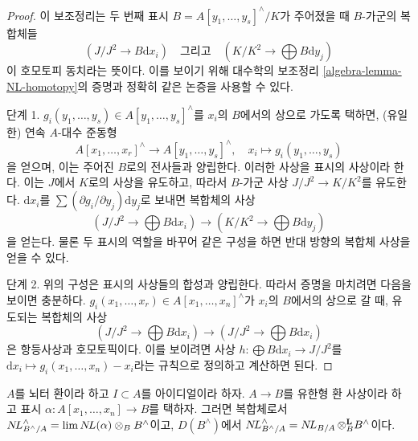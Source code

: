 \begin{proof}
이 보조정리는 두 번째 표시 $B = A[y_1, \ldots, y_s]^\wedge / K$가 주어졌을 때
$B$-가군의 복합체들
$$
(J/J^2 \to B\text{d}x_i)
\quad\text{그리고}\quad
(K/K^2 \to \bigoplus B\text{d}y_j)
$$
이 호모토피 동치라는 뜻이다. 이를 보이기 위해 대수학의 보조정리
\ref{algebra-lemma-NL-homotopy}의 증명과 정확히 같은 논증을 사용할 수 있다.

\medskip\noindent
단계 1. $g_i(y_1, \ldots, y_s) \in A[y_1, \ldots, y_s]^\wedge$를
$x_i$의 $B$에서의 상으로 가도록 택하면, (유일한) 연속 $A$-대수 준동형
$$
A[x_1, \ldots, x_r]^\wedge \to A[y_1, \ldots, y_s]^\wedge,\quad
x_i \mapsto g_i(y_1, \ldots, y_s)
$$
을 얻으며, 이는 주어진 $B$로의 전사들과 양립한다.
이러한 사상을 표시의 사상이라 한다. 이는 $J$에서 $K$로의 사상을 유도하고,
따라서 $B$-가군 사상 $J/J^2 \to K/K^2$를 유도한다.
$\text{d}x_i$를 $\sum (\partial g_i/\partial y_j)\text{d}y_j$로 보내면
복합체의 사상
$$
(J/J^2 \to \bigoplus B\text{d}x_i)
\longrightarrow
(K/K^2 \to \bigoplus B\text{d}y_j)
$$
을 얻는다. 물론 두 표시의 역할을 바꾸어 같은 구성을 하면 반대 방향의
복합체 사상을 얻을 수 있다.

\medskip\noindent
단계 2. 위의 구성은 표시의 사상들의 합성과 양립한다.
따라서 증명을 마치려면 다음을 보이면 충분하다.
$g_i(x_1, \ldots, x_r) \in A[x_1, \ldots, x_n]^\wedge$가
$x_i$의 $B$에서의 상으로 갈 때, 유도되는 복합체의 사상
$$
(J/J^2 \to \bigoplus B\text{d}x_i)
\longrightarrow
(J/J^2 \to \bigoplus B\text{d}x_i)
$$
은 항등사상과 호모토픽이다. 이를 보이려면 사상
$h : \bigoplus B \text{d}x_i \to J/J^2$를
$\text{d}x_i \mapsto g_i(x_1, \ldots, x_n) - x_i$라는 규칙으로 정의하고 계산하면 된다.
\end{proof}

\begin{lemma}
\label{lemma-NL-is-completion}
$A$를 뇌터 환이라 하고 $I \subset A$를 아이디얼이라 하자.
$A \to B$를 유한형 환 사상이라 하고 표시
$\alpha : A[x_1, \ldots, x_n] \to B$를 택하자.
그러면 복합체로서 $\mathop{N\!L}\nolimits_{B^\wedge/A}^\wedge = \mathop{\mathrm{lim}}\nolimits \mathop{N\!L}\nolimits(\alpha) \otimes_B B^\wedge$이고,
$D(B^\wedge)$에서
$\mathop{N\!L}\nolimits_{B^\wedge/A}^\wedge = \mathop{N\!L}\nolimits_{B/A} \otimes_B^\mathbf{L} B^\wedge$이다.
\end{lemma}

